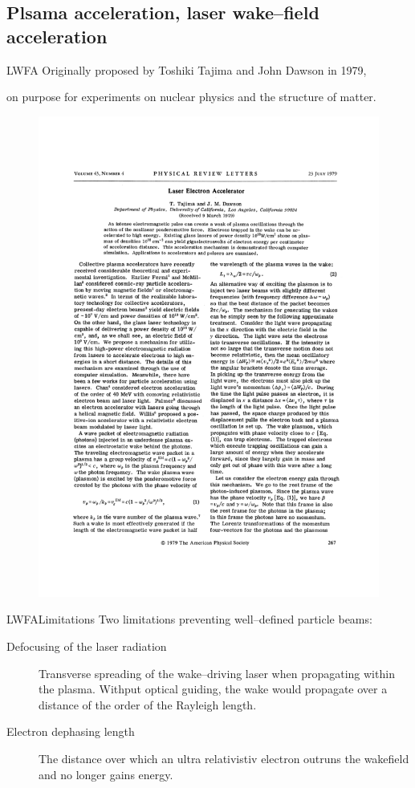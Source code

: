 \documentclass[]{beamer}
\begin{document}
  \subsection{Plsama acceleration, laser wake--field acceleration}
  \begin{frame}{LWFA}
  Originally proposed by Toshiki Tajima and John Dawson in 1979,
  
  on purpose for experiments on nuclear physics and the structure of matter.
  \begin{figure}
    \includegraphics[height=0.7\textheight]{figures/PhysRevLett.43.267.pdf}
  \end{figure}
  \end{frame}
  \begin{frame}{LWFA}{Limitations}
    Two limitations preventing well--defined particle beams:
    \begin{description}
      \item[Defocusing of the laser radiation] Transverse spreading of the wake--driving laser when propagating within the plasma. Withput optical guiding, the wake would propagate over a distance of the order of the Rayleigh length.
      \item[Electron dephasing length] The distance over which an ultra relativistiv electron outruns the wakefield and no longer gains energy.
    \end{description}
  \end{frame}
\end{document}
